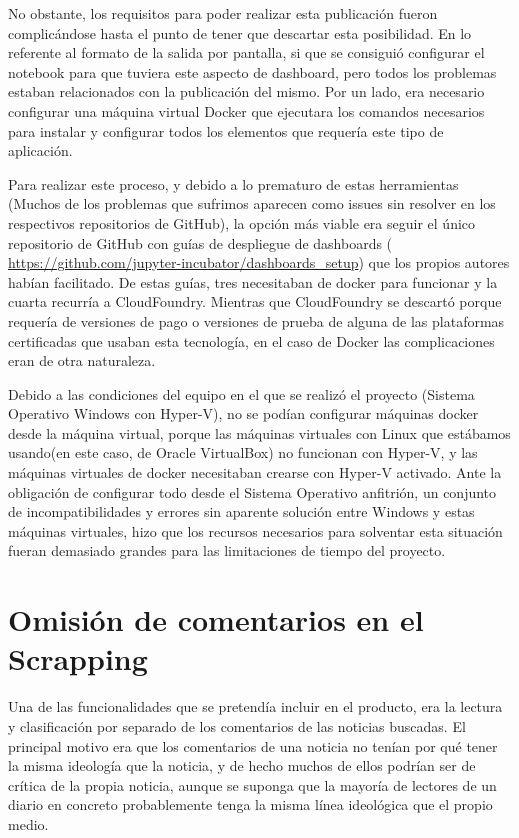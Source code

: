 No obstante, los requisitos para poder realizar esta publicación fueron complicándose hasta el punto de tener que descartar esta posibilidad. En lo referente al formato de la salida por pantalla, si que se consiguió configurar el notebook para que tuviera este aspecto de dashboard, pero todos los problemas estaban relacionados con la publicación del mismo. Por un lado, era necesario configurar una máquina virtual Docker que ejecutara los comandos necesarios para instalar y configurar todos los elementos que requería este tipo de aplicación. 

Para realizar este proceso, y debido a lo prematuro de estas herramientas (Muchos de los problemas que sufrimos aparecen como issues sin resolver en los respectivos repositorios de GitHub), la opción más viable era seguir el único repositorio de GitHub con guías de despliegue de dashboards (\url{ https://github.com/jupyter-incubator/dashboards_setup}) que los propios autores habían facilitado. De estas guías, tres necesitaban de docker para funcionar y la cuarta recurría a CloudFoundry. Mientras que CloudFoundry se descartó porque requería de versiones de pago o versiones de prueba de alguna de las plataformas certificadas que usaban esta tecnología, en el caso de Docker las complicaciones eran de otra naturaleza.

Debido a las condiciones del equipo en el que se realizó el proyecto (Sistema Operativo Windows con Hyper-V), no se podían configurar máquinas docker desde la máquina virtual, porque las máquinas virtuales con Linux que estábamos usando(en este caso, de Oracle VirtualBox) no funcionan con Hyper-V, y las máquinas virtuales de docker necesitaban crearse con Hyper-V activado. Ante la obligación de configurar todo desde el Sistema Operativo anfitrión, un conjunto de incompatibilidades y errores sin aparente solución entre Windows y estas máquinas virtuales, hizo que los recursos necesarios para solventar esta situación fueran demasiado grandes para las limitaciones de tiempo del proyecto.


\section{Omisión de comentarios en el Scrapping}

Una de las funcionalidades que se pretendía incluir en el producto, era la lectura y clasificación por separado de los comentarios de las noticias buscadas. El principal motivo era que los comentarios de una noticia no tenían por qué tener la misma ideología que la noticia, y de hecho muchos de ellos podrían ser de crítica de la propia noticia, aunque se suponga que la mayoría de lectores de un diario en concreto probablemente tenga la misma línea ideológica que el propio medio.


